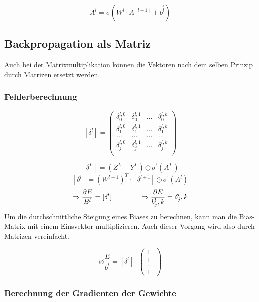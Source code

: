 \documentclass{article}
\begin{document}
 \[ A^l = \sigma (W^l \cdot A^{[l-1]} + \vec{b^l}) \]



 \subsection{Backpropagation als Matriz}
 Auch bei der Matrixmultiplikation können die Vektoren nach dem selben Prinzip durch Matrizen ersetzt werden.

 \subsubsection{Fehlerberechnung}

 \[ [\delta^l] =
 \begin{pmatrix}
    \delta_0^{l,0} & \delta_0^{l,1} & ... & \delta_0^{l,k} \\
    \delta_1^{l,0} & \delta_1^{l,1} & ... & \delta_1^{l,k} \\
    ... & ... & ... & ... \\
    \delta_j^{l,0} & \delta_j^{l,1} & ... & \delta_j^{l,k} \\
 \end{pmatrix} \]

  \[ [\delta^L] = (Z^L - Y^L) \odot \sigma^{\prime}(A^L) \]
 \[ [\delta^l] = (W^{l+1})^T \cdot [\delta^{l+1}] \odot \sigma^{\prime}(A^l) \]
\[ \Rightarrow  \frac{\partial E}{B^l} = [\delta^l]
\kern 40pt
\Rightarrow  \frac{\partial E}{b_j^l,k} = \delta_j^l,k \]
Um die durchschnittliche Steigung eines Biases zu berechnen, kann man die Bias-Matrix mit einem Einsvektor multiplizieren.
Auch dieser Vorgang wird also durch Matrizen vereinfacht.

\[ \varnothing \frac{E}{b^l} = [\delta^l] \cdot \left(\begin{array}{c}
    1 \\ 1 \\ ... \\ 1
\end{array}\right)
\]




\pagebreak


 \subsubsection{Berechnung der Gradienten der Gewichte}
\end{document}
